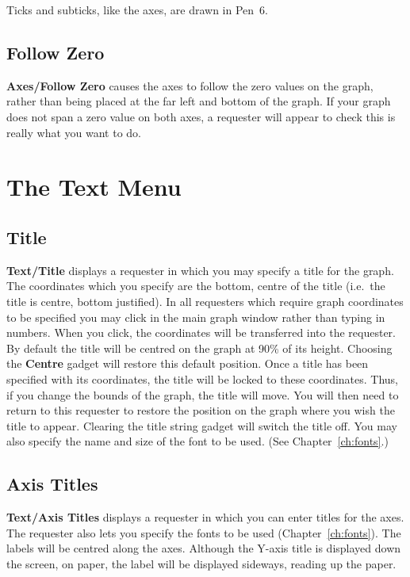 \documentclass{report}
\begin{document}
Ticks and subticks, like the axes, are drawn in Pen~6.

\subsection{Follow Zero}
{\bf Axes/Follow Zero}  causes the axes to follow 
the zero values on the graph, rather than being placed at the far left and bottom 
of the graph. If your graph does not span a zero value on both axes, a requester 
will appear to check this is really what you want to do.


\section{The Text Menu}

\subsection{Title}
{\bf Text/Title}  displays a requester in which you may specify 
a title for the graph. 
The coordinates which you specify are the bottom, centre of the title (i.e.\ the 
title is centre, bottom justified). In all requesters which require graph coordinates
to be specified you may click in the main graph window rather than typing in numbers.
When you click, the coordinates will be transferred into the requester.
By default the title will be centred on the 
graph at 90\% of its height. Choosing the {\bf Centre} gadget will restore this 
default position. Once a title has been specified with its coordinates, the title 
will be locked to these coordinates. Thus, if you change the bounds of the graph, 
the title will move. You will then need to return to this requester to restore 
the position on the graph where you wish the title to appear. Clearing the title 
string gadget will switch the title off. You may also specify the name and size
of the font to be used. (See Chapter~\ref{ch:fonts}.)


\subsection{Axis Titles}
{\bf Text/Axis Titles}  displays a requester in which you can 
enter titles for the axes. The requester also lets you specify the fonts to be used
(Chapter~\ref{ch:fonts}).
The labels will be centred along the axes. Although the Y-axis title is displayed 
down the screen, on paper, the label will be displayed sideways, reading up the paper.
\end{document}
